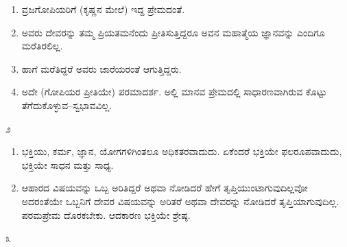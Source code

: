 \begin{enumerate}
 \item ವ್ರಜಗೋಪಿಯರಿಗೆ (ಕೃಷ್ಣನ ಮೇಲೆ) ಇದ್ದ ಪ್ರೇಮದಂತೆ.

 \item ಅವರು ದೇವರನ್ನು ತಮ್ಮ ಪ್ರಿಯತಮನೆಂದು ಪ್ರೀತಿಸುತ್ತಿದ್ದರೂ ಅವನ ಮಹಾತ್ಮೆಯ ಜ್ಞಾನವನ್ನು ಎಂದಿಗೂ ಮರೆತಿರಲಿಲ್ಲ.

 \item ಹಾಗೆ ಮರೆತಿದ್ದರೆ ಅವರು ಜಾರೆಯರಂತೆ ಆಗುತ್ತಿದ್ದರು.

 \item ಅದೇ (ಗೋಪಿಯರ ಪ್ರೀತಿಯೇ) ಪರಮಾದರ್ಶ. ಅಲ್ಲಿ ಮಾನವ ಪ್ರೇಮದಲ್ಲಿ ಸಾಧಾರಣವಾಗಿರುವ ಕೊಟ್ಟು ತೆಗೆದುಕೊಳ್ಳುವ–ಸ್ವಭಾವವಿಲ್ಲ.

\end{enumerate}

\begin{center}
೨
\end{center}

\begin{enumerate}
\item ಭಕ್ತಿಯು, ಕರ್ಮ, ಜ್ಞಾನ, ಯೋಗಗಳಿಗಿಂತಲೂ ಅಧಿಕತರವಾದುದು. ಏಕೆಂದರೆ ಭಕ್ತಿಯೇ ಫಲರೂಪವಾದುದು, ಭಕ್ತಿಯೇ ಸಾಧನ ಮತ್ತು ಸಾಧ್ಯ.

 \item ಆಹಾರದ ವಿಷಯವನ್ನು ಒಬ್ಬ ಅರಿತಿದ್ದರೆ ಅಥವಾ ನೋಡಿದರೆ ಹೇಗೆ ತೃಪ್ತಿಯುಂಟಾಗುವುದಿಲ್ಲವೋ ಅದರಂತೆಯೇ ಒಬ್ಬನಿಗೆ ದೇವರ ವಿಷಯವನ್ನು ಅರಿತರೆ ಅಥವಾ ದೇವರನ್ನು ನೋಡಿದರೆ ತೃಪ್ತಿಯಾಗುವುದಿಲ್ಲ. ಪರಮಪ್ರೇಮ ದೊರಕಬೇಕು. ಆದಕಾರಣ ಭಕ್ತಿಯೇ ಶ್ರೇಷ್ಠ.

\end{enumerate}

\begin{center}
೩
\end{center}

